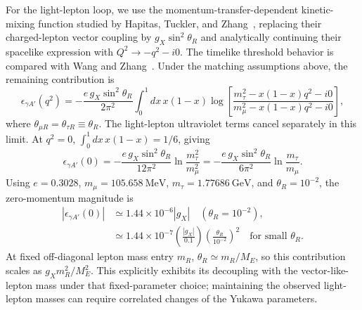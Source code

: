 \documentclass[12pt,a4paper]{article}
\begin{document}
\medskip
{}

For the light-lepton loop, we use the momentum-transfer-dependent kinetic-mixing function studied by Hapitas, Tuckler, and Zhang~\cite{Hapitas:2021kineticMixing}, replacing their charged-lepton vector coupling by \(g_X\sin^2\theta_R\) and analytically continuing their spacelike expression with \(Q^2\to-q^2-i0\). The timelike threshold behavior is compared with Wang and Zhang~\cite{Wang:2026supernova}. Under the matching assumptions above, the remaining contribution is
\[
\epsilon_{\gamma A'}(q^2)=
-\frac{e\,g_X\sin^2\theta_R}{2\pi^2}
\int_0^1 dx\,x(1-x)
\log\!\left[
\frac{m_\tau^2-x(1-x)q^2-i0}
     {m_\mu^2-x(1-x)q^2-i0}
\right],
\]
where \(\theta_{\mu R}=\theta_{\tau R}\equiv\theta_R\). The light-lepton ultraviolet terms cancel separately in this limit. At \(q^2=0\), \(\int_0^1dx\,x(1-x)=1/6\), giving
\[
\epsilon_{\gamma A'}(0)=
-\frac{e\,g_X\sin^2\theta_R}{12\pi^2}
\ln\frac{m_\tau^2}{m_\mu^2}
=-\frac{e\,g_X\sin^2\theta_R}{6\pi^2}
\ln\frac{m_\tau}{m_\mu}.
\]
Using \(e=0.3028\), \(m_\mu=105.658~\mathrm{MeV}\), \(m_\tau=1.77686~\mathrm{GeV}\), and \(\theta_R=10^{-2}\), the zero-momentum magnitude is
\[
\begin{aligned}
|\epsilon_{\gamma A'}(0)|&\simeq1.44\times10^{-6}|g_X|\quad(\theta_R=10^{-2}),\\
&\simeq1.44\times10^{-7}
\left(\frac{|g_X|}{0.1}\right)
\left(\frac{\theta_R}{10^{-2}}\right)^2
\quad\text{for small }\theta_R.
\end{aligned}
\]
At fixed off-diagonal lepton mass entry \(m_R\), \(\theta_R\simeq m_R/M_E\), so this contribution scales as \(g_Xm_R^2/M_E^2\). This explicitly exhibits its decoupling with the vector-like-lepton mass under that fixed-parameter choice; maintaining the observed light-lepton masses can require correlated changes of the Yukawa parameters.
\end{document}
